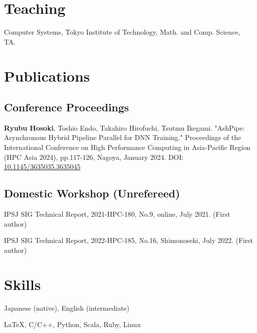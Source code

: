 \documentclass[10pt]{article}
\begin{document}
\section{Teaching}
\begin{description}[align=left,leftmargin=1.2cm,style=multiline]
  \item[2023] Computer Systems, Tokyo Institute of Technology, Math. and Comp. Science, TA.
\end{description}


\section{Publications}
\subsection{Conference Proceedings}
\begin{description}[align=left,leftmargin=0.5cm,style=multiline]
  \item[1.] 
  {\bf Ryubu Hosoki}, Toshio Endo, Takahiro Hirofuchi, Tsutmu Ikegami. "AshPipe: Asynchronous Hybrid Pipeline Parallel for DNN Training." Proceedings of the International Conference on High Performance Computing in Asia-Pacific Region (HPC Asia 2024), pp.117-126, Nagoya, January 2024. {\small DOI: \href{https://dl.acm.org/doi/10.1145/3635035.3635045}{10.1145/3635035.3635045}}
\end{description}

\subsection{Domestic Workshop (Unrefereed)}
\begin{description}[align=left,leftmargin=0.5cm,style=multiline]
  \item[1.] IPSJ SIG Technical Report, 2021-HPC-180, No.9, online, July 2021. (First author)
  \item[2.] IPSJ SIG Technical Report, 2022-HPC-185, No.16, Shimonoseki, July 2022. (First author)
\end{description}


\section{Skills}
\begin{description}[align=left,leftmargin=2.5cm,style=multiline]
  \setlength{\itemsep}{0pt}
  \item [Languages] Japanese (native), English (intermediate)
  \item [Coding] \LaTeX, C/C++, Python, Scala, Ruby, Linux
\end{description}
\end{document}
